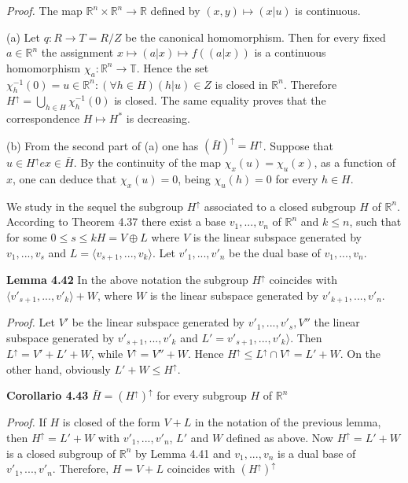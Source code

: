 \documentclass[12pt]{article}
\begin{document}
    \emph{Proof.} The map $\mathbb{R}^n \times \mathbb{R}^n \to \mathbb{R}$ defined by $(x, y) \mapsto (x|u)$ is continuous.
    
    
        (a) Let $q : R \to T = R/Z$ be the canonical homomorphism. Then for every fixed $a \in \mathbb{R}^n$ the assignment
    $x \mapsto (a|x) \mapsto f((a|x))$ is a continuous homomorphism $\chi_a : \mathbb{R}^n \to \mathbb{T}$. Hence the set
    $\chi^{-1}_h (0) = {u \in \mathbb{R}^n : (\forall h \in H)(h|u) ∈ Z}$ is closed in $\mathbb{R}^n$. Therefore $H^{\uparrow} =\bigcup_{h \in H} \chi^{-1}_h (0)$ is closed. The same equality proves that the
    correspondence $H \mapsto H^*$ is decreasing.
    
    
        (b) From the second part of (a) one has $(\bar{H})^\uparrow = H^{\uparrow}$. Suppose that $u \in H^{\uparrow}e x \in \bar{H}$. By the continuity of the
    map $\chi_x (u) = \chi_u(x)$, as a function of $x$, one can deduce that $\chi_x(u) = 0$, being $\chi_u(h) = 0$ for every $h \in H$.
    
    
        We study in the sequel the subgroup $H^{\uparrow}$ associated to a closed subgroup $H$ of $\mathbb{R}^n$. According to Theorem
    4.37 there exist a base $v_1, . . . , v_n$ of $\mathbb{R}^n$ and $k \leq n$, such that for some $0 \leq s \leq k H = V \oplus L$ where $V$ is the
    linear subspace generated by $v_1, . . . , v_s$ and $L = \langle v_{s+1}, . . . , v_k \rangle$. Let $v'_1    , . . . , v'_n$ be the dual base of $v_1, . . . , v_n$.
    

\textbf{Lemma 4.42} In the above notation the subgroup $H^{\uparrow}$ coincides with $\langle v'_{s+1}, . . . , v'_{k} \rangle + W$, where $W$ is the linear
subspace generated by $v'_{k+1}, . . . , v'_n$.


\emph{Proof.} Let $V'$ be the linear subspace generated by $v'_1, . . . , v'_s, V''$ the linear subspace generated by $v'_{s+1}, . . . , v'_k$
and $L' = v'_{s+1}, . . . , v'_k \rangle$. Then $L^{\uparrow} = V' + L' + W$, while $V^{\uparrow} = V'' + W$. Hence $H^{\uparrow} \leq L^{\uparrow} \cap V^{\uparrow} = L' + W$. On the
other hand, obviously $L' + W \leq H^{\uparrow}$.


\textbf{Corollario 4.43} $\bar{H} = (H^{\uparrow})^{\uparrow}$ for every subgroup $H$ of $\mathbb{R}^n$


\emph{Proof.} If $H$ is closed of the form $V+L$ in the notation of the previous lemma, then $H^{\uparrow} = L' + W$ with $v'_1, . . . , v'_n$,
$L'$ and $W$ defined as above. Now $H^{\uparrow} = L' + W$ is a closed subgroup of $\mathbb{R}^n$ by Lemma 4.41 and $v_1, . . . , v_n$ is a
dual base of $v'_1, . . . , v'_n$. Therefore, $H = V + L$ coincides with $(H^{\uparrow})^{\uparrow}$
\end{document}
